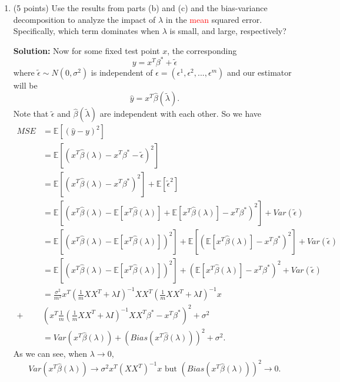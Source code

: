 \documentclass[twoside,10pt]{article}
\begin{document}
\begin{enumerate}
\begin{enumerate}
\item (5 points) Use the results from parts (b) and (c) and the bias-variance decomposition to analyze the impact of $\lambda$ in the \textcolor{red}{mean} squared error. Specifically, which term dominates when $\lambda$ is small, and large, respectively?
\begin{tcolorbox}
\textbf{Solution:}
Now for some fixed test point $x$, the corresponding $$y = x^T \beta^* + \tilde{\epsilon} $$ where  $\tilde{\epsilon} \sim N(0,\sigma^2)$ is independent of $\epsilon = (\epsilon^1, \epsilon^2, ..., \epsilon^m)$ and our estimator will be 
$$\hat{y} = x^T \hat{\beta}(\tilde{\lambda}).$$ 
Note that $\tilde{\epsilon}$ and $\hat{\beta}(\tilde{\lambda})$ are independent with each other.
So we have
\begin{align*}
MSE &= \mathbb{E}\left[(\hat{y} -y )^2\right]\\
&= \mathbb{E}\left[(x^T \hat{\beta}(\lambda) - x^T \beta^* - \tilde{\epsilon} )^2\right]\\
&=  \mathbb{E}\left[(x^T \hat{\beta}(\lambda) - x^T \beta^*) ^2 \right]  + \mathbb{E}\left[\tilde{\epsilon}^2\right] \\
&=  \mathbb{E}\left[\left(x^T \hat{\beta}(\lambda) - \mathbb{E}[x^T\hat{\beta}(\lambda) ] + \mathbb{E}[x^T\hat{\beta}(\lambda) ]    - x^T \beta^*\right) ^2 \right]  + Var(\tilde{\epsilon}) \\
& = \mathbb{E}\left[\left(x^T \hat{\beta}(\lambda) - \mathbb{E}[x^T\hat{\beta}(\lambda) ]\right)^2\right] +\mathbb{E}\left[ \left( \mathbb{E}[x^T\hat{\beta}(\lambda) ]    - x^T \beta^*\right) ^2 \right]  + Var(\tilde{\epsilon}) \\
& = \mathbb{E}\left[\left(x^T \hat{\beta}(\lambda) - \mathbb{E}[x^T\hat{\beta}(\lambda) ]\right)^2\right] +\left( \mathbb{E}[x^T\hat{\beta}(\lambda) ]    - x^T \beta^*\right) ^2 + Var(\tilde{\epsilon}) \\
&=\frac {\sigma^2} {m^2} x^T \left( \frac 1 m XX^T + \lambda I \right)^{-1}  XX^T  \left( \frac 1 m XX^T + \lambda I \right)^{-1}  x \\
+& \left(x^T \frac 1 {m} \left( \frac 1 m XX^T + \lambda I \right)^{-1}  XX^T \beta^* - x^T {\beta^*} \right)^2 + \sigma^2 \\
& = Var(x^T \hat{\beta}(\lambda)) + \left(Bias(x^T \hat{\beta}(\lambda))\right)^2 + \sigma^2. 
\end{align*}
As we can see, when $\lambda \rightarrow 0$, $$Var(x^T \hat{\beta}(\lambda)) \rightarrow \sigma^2x^T(XX^T)^{-1}x \text{ but } \left(Bias(x^T \hat{\beta}(\lambda))\right)^2 \rightarrow 0.$$

\end{tcolorbox}
\end{enumerate}
\end{enumerate}
\end{document}
